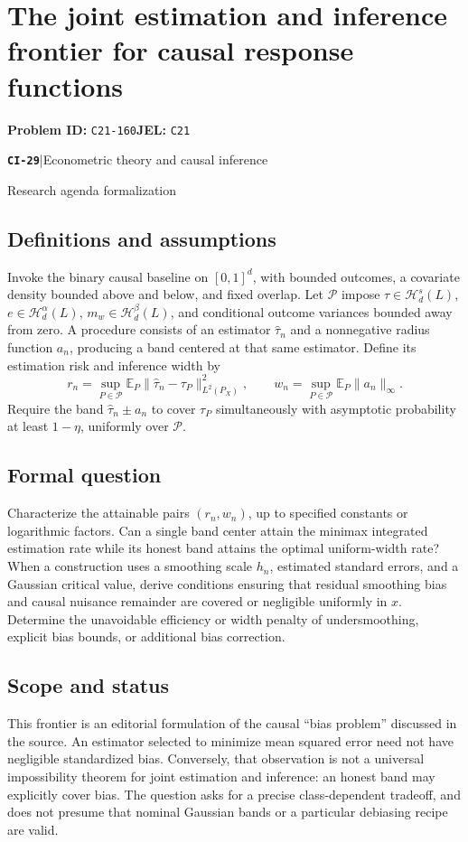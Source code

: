 \documentclass[11pt,a4paper]{article}
\newcommand{\E}{\mathbb E}
\newcommand{\entrymeta}[3]{{\sffamily\small\color{muted}\textbf{\texttt{#1}}\quad|\quad #2\par #3\par}}
\begin{document}
\section*{The joint estimation and inference frontier for causal response functions}
\textbf{Problem ID:} \texttt{C21-160}\quad \textbf{JEL:} \texttt{C21}\par
\label{problem:OP-0508}
\label{beyond:CI-29}
\entrymeta{CI-29}{Econometric theory and causal inference}{Research agenda formalization}
\subsection*{Definitions and assumptions}
Invoke the binary causal baseline on $[0,1]^d$, with bounded outcomes, a covariate density bounded above and below, and fixed overlap. Let $\mathcal P$ impose $\tau\in\mathcal H_d^s(L)$, $e\in\mathcal H_d^\alpha(L)$, $m_w\in\mathcal H_d^\beta(L)$, and conditional outcome variances bounded away from zero. A procedure consists of an estimator $\widehat\tau_n$ and a nonnegative radius function $a_n$, producing a band centered at that same estimator. Define its estimation risk and inference width by
\[
 r_n=\sup_{P\in\mathcal P}\E_P\|\widehat\tau_n-\tau_P\|_{L^2(P_X)}^2,
 \qquad w_n=\sup_{P\in\mathcal P}\E_P\|a_n\|_\infty.
\]
Require the band $\widehat\tau_n\pm a_n$ to cover $\tau_P$ simultaneously with asymptotic probability at least $1-\eta$, uniformly over $\mathcal P$.
\subsection*{Formal question}
Characterize the attainable pairs $(r_n,w_n)$, up to specified constants or logarithmic factors. Can a single band center attain the minimax integrated estimation rate while its honest band attains the optimal uniform-width rate? When a construction uses a smoothing scale $h_n$, estimated standard errors, and a Gaussian critical value, derive conditions ensuring that residual smoothing bias and causal nuisance remainder are covered or negligible uniformly in $x$. Determine the unavoidable efficiency or width penalty of undersmoothing, explicit bias bounds, or additional bias correction.
\subsection*{Scope and status}
This frontier is an editorial formulation of the causal ``bias problem'' discussed in the source. An estimator selected to minimize mean squared error need not have negligible standardized bias. Conversely, that observation is not a universal impossibility theorem for joint estimation and inference: an honest band may explicitly cover bias. The question asks for a precise class-dependent tradeoff, and does not presume that nominal Gaussian bands or a particular debiasing recipe are valid.
\end{document}
